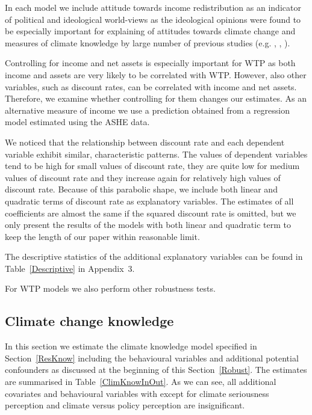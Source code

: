 \documentclass[a4paper,12pt]{article}
\begin{document}
In each model we include attitude towards income redistribution as an indicator of political and ideological world-views as the ideological opinions were found to be especially important for explaining of attitudes towards climate change and measures of climate knowledge by large number of previous studies (e.g. \citet{Hamilton2011}, \citet{Kahan2012}, \citet{Kellstedt2008}).


Controlling for income and net assets is especially important for WTP as both income and assets are very likely to be correlated with WTP. However, also other variables, such as discount rates, can be correlated with income and net assets. Therefore, we examine whether controlling for them changes our estimates. As an alternative measure of income we use a prediction obtained from a regression model estimated using the ASHE data.

We noticed that the relationship between discount rate and each dependent variable exhibit similar, characteristic patterns. The values of dependent variables tend to be high for small values of discount rate, they are quite low for medium values of discount rate and they increase again for relatively high values of discount rate. Because of this parabolic shape, we include both linear and quadratic terms of discount rate as explanatory variables. The estimates of all coefficients are almost the same if the squared discount rate is omitted, but we only present the results of the models with both linear and quadratic term to keep the length of our paper within reasonable limit.

The descriptive statistics of the additional explanatory variables can be found in Table~\ref{Descriptive} in Appendix~$3$.

For WTP models we also perform other robustness tests. 



\subsection{Climate change knowledge}\label{RobKnow}



In this section we estimate the climate knowledge model specified in Section~\ref{ResKnow} including the behavioural variables and additional potential confounders as discussed at the beginning of this Section~\ref{Robust}. The estimates are summarised in Table~\ref{ClimKnowInOut}. As we can see, all additional covariates and behavioural variables with except for climate seriousness perception and climate versus policy perception are insignificant. 
\end{document}
